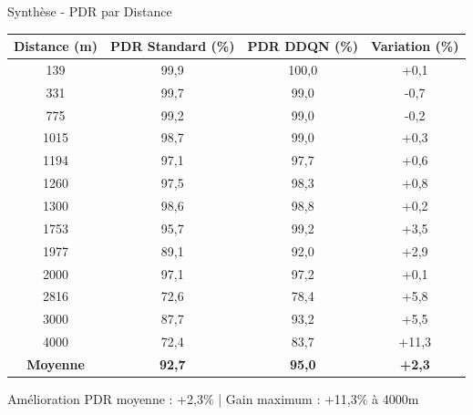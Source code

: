 \documentclass[12pt,aspectratio=169]{beamer}
\begin{document}
\begin{frame}[fragile]{Synthèse - PDR par Distance}
	\centering
	\begin{tabular}{|c|c|c|c|}
		\hline
		\tiny
		\textbf{Distance (m)} & \textbf{PDR Standard (\%)} & \textbf{PDR DDQN (\%)} & \textbf{Variation (\%)} \\
		\hline
		139  & 99,9 & 100,0 & +0,1 \\
		331  & 99,7 & 99,0  & -0,7 \\
		775  & 99,2 & 99,0  & -0,2 \\
		1015 & 98,7 & 99,0  & +0,3 \\
		1194 & 97,1 & 97,7  & +0,6 \\
		1260 & 97,5 & 98,3  & +0,8 \\
		1300 & 98,6 & 98,8  & +0,2 \\
		1753 & 95,7 & 99,2  & +3,5 \\
		1977 & 89,1 & 92,0  & +2,9 \\
		2000 & 97,1 & 97,2  & +0,1 \\
		2816 & 72,6 & 78,4  & +5,8 \\
		3000 & 87,7 & 93,2  & +5,5 \\
		4000 & 72,4 & 83,7  & +11,3 \\
		\hline
		\textbf{Moyenne} & \textbf{92,7} & \textbf{95,0} & \textbf{+2,3} \\
		\hline
	\end{tabular}
	
	\vspace{0.3cm}
	Amélioration PDR moyenne : +2,3\% | Gain maximum : +11,3\% à 4000m
\end{frame}
\end{document}

